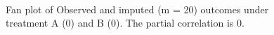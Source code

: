 \begin{figure}[ht!]
\begin{center}
{{				}
			}\\
		\end{center}
		\caption{Fan plot of Observed and imputed (m = 20) outcomes under treatment A (0) and B (0). The partial correlation is 0.}
		\label{fig4_9}
	\end{figure}
	
